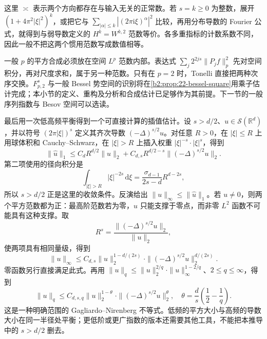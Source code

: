 这里 \(\asymp\) 表示两个方向都存在与输入无关的正常数。若 \(s=k\geq0\) 为整数，展开 \((1+4\pi^2|\xi|^2)^k\)，或把它与 \(\sum_{|\alpha|\leq k}|(2\pi\mathrm i\xi)^\alpha|^2\) 比较，再用分布导数的 Fourier 公式，就得到与弱导数定义的 \(H^k=W^{k,2}\) 范数等价。各多重指标的计数系数不同，因此一般不把这两个惯用范数写成数值相等。

\ProseParagraphBreak

一般 \(p\) 的平方合成必须放在空间 \(L^p\) 范数内部。表达式 \(\sum_j2^{2js}\|P_jf\|_p^2\) 先对空间积分，再对尺度求和，属于另一种范数。只有在 \(p=2\) 时，Tonelli 直接把两种次序交换。\(F^s_{p,2}\) 与一般 Bessel 势空间的识别将在\cref{b2:prop:22-bessel-square}用乘子估计完成；本小节的定义、重构及分析和合成估计已足够作为其前提。下一节的一般序列指数与 Besov 空间可以选读。

\ProseParagraphBreak

最后用一次低高频平衡得到一个可直接计算的插值估计。设 \(s>d/2\)、\(u\in\mathcal S(\mathbb R^d)\)，并以符号 \((2\pi|\xi|)^s\) 定义其齐次导数 \((-\Delta)^{s/2}u\)。对任意 \(R>0\)，在 \(|\xi|\leq R\) 上用球体积和 Cauchy--Schwarz，在 \(|\xi|>R\) 上插入权重 \(|\xi|^{-s}\cdot|\xi|^s\)，得到
\[
 \|\widehat u\|_1
 \leq C_dR^{d/2}\|u\|_2
      +C_{d,s}R^{d/2-s}\|(-\Delta)^{s/2}u\|_2.
\]
第二项使用的径向积分是
\[
 \int_{|\xi|>R}|\xi|^{-2s}\,\mathrm d\xi
 =\frac{\sigma_{d-1}}{2s-d}R^{d-2s},
\]
所以 \(s>d/2\) 正是这里的收敛条件。反演给出 \(\|u\|_\infty\leq\|\widehat u\|_1\)。若 \(u\ne0\)，则两个平方范数都为正：最高阶范数若为零，\(\widehat u\) 只能支撑于零点，而非零 \(L^2\) 函数不可能具有这种支撑。取
\[
 R^s=\frac{\|(-\Delta)^{s/2}u\|_2}{\|u\|_2},
\]
使两项具有相同量级，得到
\[
 \|u\|_\infty
 \leq C_{d,s}\|u\|_2^{1-d/(2s)}
                     \cdot\|(-\Delta)^{s/2}u\|_2^{d/(2s)}.
\]
零函数另行直接满足此式。再用
\(\|u\|_q\leq\|u\|_2^{2/q}\cdot\|u\|_\infty^{1-2/q}\)、\(2\leq q\leq\infty\)，得到
\[
 \|u\|_q\leq C_{d,s,q}\|u\|_2^{1-\theta}
                         \cdot\|(-\Delta)^{s/2}u\|_2^\theta,
 \quad
 \theta=\frac d s\left(\frac12-\frac1q\right).
\]
这是一种明确范围的 Gagliardo--Nirenberg 不等式。低频的平方大小与高频的导数大小在同一半径处平衡；更低阶或更广指数的版本还需要其他工具，不能把本推导中的 \(s>d/2\) 删去。

